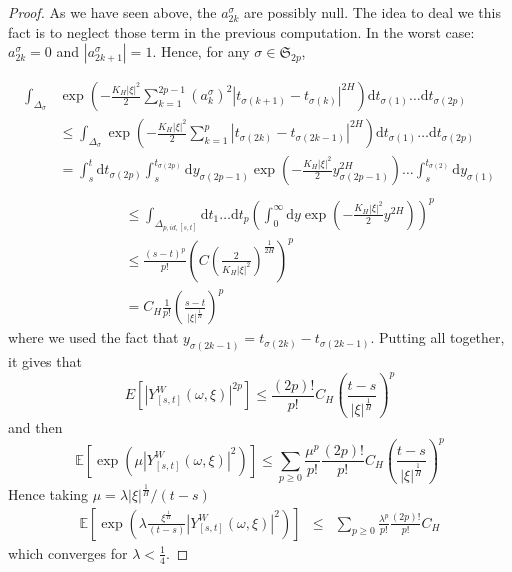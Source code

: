 \documentclass[11pt,a4paper,draft,reqno]{amsart}
\theoremstyle{definition}
\newcommand{\expect}{\mathbb{E}}
\newcommand{\dd}{\mathrm{d}}
\renewcommand{\S}{\mathfrak{S}}
\begin{document}
\begin{proof}
\noindent As we have seen above, the $a_{2k}^\sigma$ are possibly null. The idea to deal we this fact is to neglect those term
in the previous computation. In the worst case: $a_{2k}^\sigma=0$ and $\left|a_{2k+1}^\sigma\right|=1$. Hence, for any
$\sigma\in\S_{2p}$,

\begin{equation}
\begin{split}
\int_{\Delta_\sigma} &
		\exp\left(
			-\frac{K_H|\xi|^2} 2 
			\sum_{k=1}^{2p-1}
				\left(a_k^{\sigma}\right)^2 \left|t_{\sigma(k+1)}-t_{\sigma(k)}\right|^{2H}
		\right)
	\dd t_{\sigma(1)}\dots \dd t_{\sigma(2p)}
 \\
& \le 
\int_{\Delta_\sigma}
	\exp\left(
		-\frac{K_H|\xi|^2} 2 \sum_{k=1}^{p} \left|t_{\sigma(2k)}-t_{\sigma(2k-1)}\right|^{2H}
	\right)
\dd t_{\sigma(1)}\dots \dd t_{\sigma(2p)}\\
&= 
\int_{s}^t\dd t_{\sigma(2p)}
\int_{s}^{t_{\sigma(2p)}}\dd y_{\sigma(2p-1)}\exp\left(-\frac{K_H|\xi|^2} 2 y_{\sigma(2p-1)}^{2H}\right)\dots
\int_{s}^{t_{\sigma(2)}}\dd y_{\sigma(1)}
\\
\end{split}
\end{equation}
\begin{equation}
\begin{split}
\qquad & \le 
\int_{\Delta_{p,id,[s,t]}}\dd t_{1}\dots \dd t_{p}
\left(\int_{0}^\infty \dd y\exp\left(-\frac{K_H|\xi|^2} 2 y^{2H}\right)\right)^p\\
& \le 
\frac{(s-t)^p}{p!}\left(C\left(\frac {2} {K_H |\xi|^2} \right)^{\frac 1 {2H}} \right)^{p}\\
& = 
C_H\frac 1 {p!} \left(\frac {s-t} {|\xi|^{\frac 1 H}}\right)^p
\end{split}
\end{equation}
where we used the fact that $y_{\sigma(2k-1)}=t_{\sigma(2k)}-t_{\sigma(2k-1)}$. Putting all together, it gives that
$$E\left[|Y^W_{[s,t]}(\omega,\xi)|^{2p}\right]\le \frac {(2p)!} {p!} C_H\left (\frac {t-s} {|\xi|^{\frac 1 H}}\right)^p$$
and then
$$\expect\left[\exp\left(\mu|Y^W_{[s,t]}(\omega,\xi)|^2\right)\right]\le \sum_{p\ge 0}\frac {\mu^p} {p!} \frac {(2p)!} {p!}
C_H\left (\frac {t-s} {|\xi|^{\frac 1 H}}\right)^p$$
 Hence taking $\mu=\lambda |\xi|^{\frac 1 H}/(t-s)$
\begin{eqnarray*}
\expect 
	\left[
		\exp
			\left(
				\lambda
				\frac
					{\xi^{\frac 1 H}}
					{(t-s)}
				\left|Y^W_{[s,t]}(\omega,\xi)\right|^2
			\right)
	\right]
&\le&
\sum_{p\ge 0}\frac {\lambda^p} {p!} \frac {(2p)!} {p!}C_H
\end{eqnarray*}
which converges for $\lambda <\frac 14$.\qedhere
\end{proof}
\end{document}
